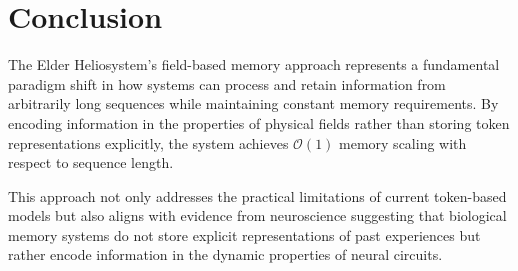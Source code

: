 \section{Conclusion}

The Elder Heliosystem's field-based memory approach represents a fundamental paradigm shift in how systems can process and retain information from arbitrarily long sequences while maintaining constant memory requirements. By encoding information in the properties of physical fields rather than storing token representations explicitly, the system achieves $\mathcal{O}(1)$ memory scaling with respect to sequence length.

This approach not only addresses the practical limitations of current token-based models but also aligns with evidence from neuroscience suggesting that biological memory systems do not store explicit representations of past experiences but rather encode information in the dynamic properties of neural circuits.